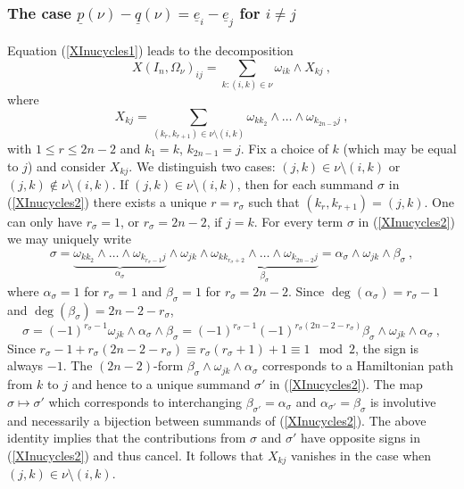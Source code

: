 \documentclass[10pt]{amsart}
\newcommand{\pp}{{\underline{p}}}
\newcommand{\qq}{{\underline{q}}}
\newcommand{\eee}{{\underline{e}}}
\theoremstyle{plain}
\newcommand{\0}{\color{blue}{\mathsf{0}}}
\begin{document}
\subsubsection{The case $\pp(\nu)-\qq(\nu)=\eee_i-\eee_j$ for $i\neq j$}
Equation (\ref{XInucycles1}) leads to the decomposition
\begin{equation}  \label{XInurecursion}
X(I_n, \Omega_\nu)_{ij} = \sum_{k:(i,k)\in\nu} \omega_{ik}\wedge X_{kj}\ ,
\end{equation}
where
\begin{equation}  \label{XInucycles2}
X_{kj} = \sum_{(k_r,k_{r+1})\in\nu\setminus(i,k)}\omega_{k k_2} \wedge \ldots \wedge \omega_{k_{2n-2} j}\ ,
\end{equation}
with $1\leq r\leq 2n-2$ and $k_1=k$, $k_{2n-1}=j$. Fix a choice of  $k$ (which may be equal to $j$) and consider $X_{kj}$. We   distinguish two cases: $(j,k)\in\nu\setminus(i,k)$ or 
$(j,k)\notin\nu\setminus(i,k)$.
If $(j,k)\in\nu\setminus(i,k)$, then for each summand $\sigma$ in (\ref{XInucycles2})  there exists a unique $r=r_{\sigma}$ 
such that  $(k_r, k_{r+1})=(j,k)$.  One can only have $r_\sigma=1$, or $r_\sigma=2n-2$,  if $j=k$.
For every term   $\sigma$ in  (\ref{XInucycles2})  we may uniquely  write
\[ \sigma =   \underbrace{ \omega_{k k_2}\wedge\ldots\wedge\omega_{k_{r_\sigma-1} j}}_{\alpha_{\sigma}} \wedge \omega_{jk} \wedge \underbrace{\omega_{k k_{r_\sigma+2}} \wedge\ldots\wedge \omega_{k_{2n-2} j}}_{\beta_{\sigma}} = \alpha_{\sigma} \wedge \omega_{jk} \wedge \beta_{\sigma}\ , \]
where $\alpha_\sigma=1$ for $r_\sigma=1$ and $\beta_\sigma=1$ for $r_\sigma=2n-2$.
Since $\deg(\alpha_{\sigma})=r_\sigma-1$ and $\deg(\beta_{\sigma})=2n-2-r_\sigma$, 
\[  \sigma =  (-1)^{r_\sigma-1}  \omega_{jk}  \wedge \alpha_{\sigma}\wedge  \beta_{\sigma} =  (-1)^{r_\sigma-1}(-1)^{ r_\sigma(2n-2-r_\sigma)}    \beta_{\sigma}  \wedge\omega_{jk} \wedge \alpha_{\sigma}\ , \]
Since $ r_\sigma-1  + r_\sigma (2n-2-r_\sigma) \equiv r_\sigma(r_\sigma+1)+1 \equiv 1 \mod 2 $, the sign is always $-1$. The $(2n-2)$-form  $\beta_{\sigma}  \wedge\omega_{jk} \wedge \alpha_{\sigma}$ corresponds to a Hamiltonian path from $k$ to $j$ and hence to a unique summand $\sigma'$ in   (\ref{XInucycles2}). 
The map $\sigma\mapsto \sigma'$ which corresponds to interchanging $\beta_{\sigma'}=\alpha_{\sigma}$ and $\alpha_{\sigma'}=\beta_{\sigma}$ is involutive and necessarily a bijection between summands of (\ref{XInucycles2}). The above identity  implies that the contributions from $\sigma$ and $\sigma'$  have opposite signs in 
 (\ref{XInucycles2}) and thus  cancel.  It follows that  $X_{kj}$ vanishes in the case when $(j,k)\in\nu\setminus(i,k)$. 
\end{document}
